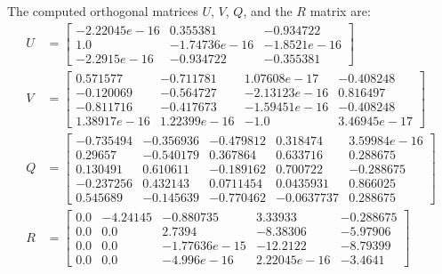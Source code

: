 \begin{enumerate}[(1).]
            The computed orthogonal matrices $U$, $V$, $Q$, and the $R$ matrix are: 
            \begin{align*}
                U &= \begin{bmatrix}
                     -2.22045e-16 &  0.355381  &   -0.934722  \\
                      1.0   &       -1.74736e-16 &  -1.8521e-16 \\
                     -2.2915e-16 &  -0.934722  &   -0.355381  
                \end{bmatrix} \\
                V &= \begin{bmatrix}
                      0.571577  &   -0.711781  &    1.07608e-17 & -0.408248 \\  
                     -0.120069  &   -0.564727  &   -2.13123e-16 &  0.816497 \\  
                     -0.811716  &   -0.417673  &   -1.59451e-16 & -0.408248 \\   
                      1.38917e-16 &  1.22399e-16 & -1.0     &      3.46945e-17
                \end{bmatrix} \\
                Q &= \begin{bmatrix}
                     -0.735494 & -0.356936 & -0.479812 &  0.318474  &  3.59984e-16 \\
                      0.29657 &  -0.540179 &  0.367864 &  0.633716  &  0.288675 \\ 
                      0.130491 &  0.610611 & -0.189162 &  0.700722  & -0.288675  \\ 
                     -0.237256 &  0.432143 &  0.0711454 & 0.0435931 &  0.866025 \\  
                      0.545689 & -0.145639 & -0.770462 &  -0.0637737 &  0.288675 
                \end{bmatrix} \\
                R &= \begin{bmatrix}
                    0.0 & -4.24145 & -0.880735 & 3.33933 & -0.288675 \\
                    0.0 &  0.0  &  2.7394 & -8.38306 & -5.97906 \\
                    0.0 &  0.0  &  -1.77636e-15 & -12.2122 & -8.79399 \\
                    0.0 &  0.0  &  -4.996e-16 & 2.22045e-16 & -3.4641  
                \end{bmatrix}    
            \end{align*}


\end{enumerate}
